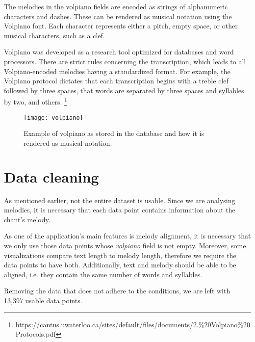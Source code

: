 The melodies in the volpiano fields are encoded as strings of alphanumeric characters and dashes. These can be rendered as musical notation using
the Volpiano font. Each character represents either a pitch, empty space, or other musical characters, such as a clef.

Volpiano was developed as a research tool optimized for databases and word processors. There are strict rules concerning the transcription, which leads
to all Volpiano-encoded melodies having a standardized format. For example, the Volpiano protocol dictates that each transcription begins with
a treble clef followed by three spaces, that words are separated by three spaces and syllables by two, and others.
\footnote{https://cantus.uwaterloo.ca/sites/default/files/documents/2.\%20Volpiano\%20Protocols.pdf}

\begin{figure}[h!]
\centering
\texttt{[image: volpiano]}
\caption{Example of volpiano as stored in the database and how it is rendered as musical notation. \cite[Figure~2]{cantus_lacoste}}
\end{figure}

\section{Data cleaning}

As mentioned earlier, not the entire dataset is usable. Since we are analysing melodies, it is necessary that each data point contains information
about the chant's melody.

As one of the application's main features is melody alignment, it is necessary that we only use those data points whose \emph{volpiano} field is
not empty. Moreover, some visualizations compare text length to melody length, therefore we require the data points to have both. Additionally, 
text and melody should be able to be aligned, i.e. they contain the same number of words and syllables.

Removing the data that does not adhere to the conditions, we are left with 13,397 usable data points.

